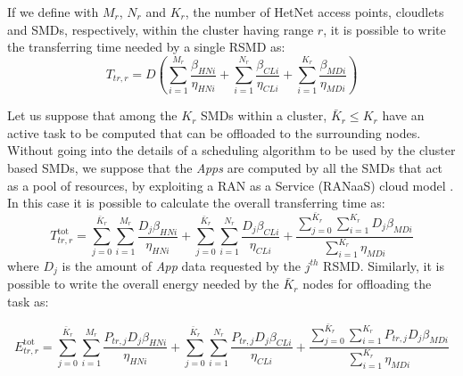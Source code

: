 \documentclass[twoside,openright]{report}
\begin{document}
If we define with $M_r$, $N_r$ and $K_r$, the number of \gls{HetNet} access points, cloudlets and \glspl{SMD}, respectively, within the cluster having range $r$, it is possible to write the transferring time needed by a single \gls{RSMD} as:
\begin{equation}
\label{eq:Ttr-r}
T_{\textit{tr},r} =  D  \left (  \sum_{i=1}^{M_r}\frac{\beta_\textit{HNi}}{\eta_\textit{HNi}}  + \sum_{i=1}^{N_r}\frac{\beta_\textit{CLi}}{\eta_\textit{CLi}}+ \sum_{i=1}^{K_r}\frac{\beta_\textit{MDi}}{\eta_\textit{MDi}} \right )
\end{equation}

Let us suppose that among the $K_r$ \glspl{SMD} within a cluster, $\bar{K}_r \leq K_r$ have an active task to be computed that can be offloaded to the surrounding nodes. Without going into the details of a scheduling algorithm to be used by the cluster based \glspl{SMD}, we suppose that the \emph{Apps} are computed by all the \glspl{SMD} that act as a pool of resources, by exploiting a RAN as a Service (RANaaS) cloud model \cite{sabella13}. In this case it is possible to calculate the overall transferring time as:
\begin{equation}
\label{T_tr_tot}
T^{\text{tot}}_{\textit{tr},r} =  \sum_{j=0}^{\bar{K}_r}\sum_{i=1}^{M_r}\frac{D_j\beta_\textit{HNi}}{\eta_\textit{HNi}}  +\sum_{j=0}^{\bar{K}_r} \sum_{i=1}^{N_r}\frac{D_j\beta_\textit{CLi}}{\eta_\textit{CLi}} + \frac{\sum_{j=0}^{\bar{K}_r}\sum_{i=1}^{K_r}D_j\beta_\textit{MDi}}{\sum_{i=1}^{K_r}\eta_\textit{MDi}}
\end{equation}
where $D_j$ is the amount of \emph{App} data requested by the $j^{th}$ \gls{RSMD}.  Similarly, it is possible to write the overall energy needed by the $\bar{K}_r$ nodes for offloading the task as:

\begin{equation}
\label{E_tr_tot}
E^{\text{tot}}_{\textit{tr},r} =  \sum_{j=0}^{\bar{K}_r}\sum_{i=1}^{M_r}\frac{P_{tr,j}D_j\beta_\textit{HNi}}{\eta_\textit{HNi}}  +\sum_{j=0}^{\bar{K}_r} \sum_{i=1}^{N_r}\frac{P_{tr,j}D_j\beta_\textit{CLi}}{\eta_\textit{CLi}} + \frac{\sum_{j=0}^{\bar{K}_r}\sum_{i=1}^{K_r}P_{tr,j}D_j\beta_\textit{MDi}}{\sum_{i=1}^{K_r}\eta_\textit{MDi}}
\end{equation}
\end{document}
